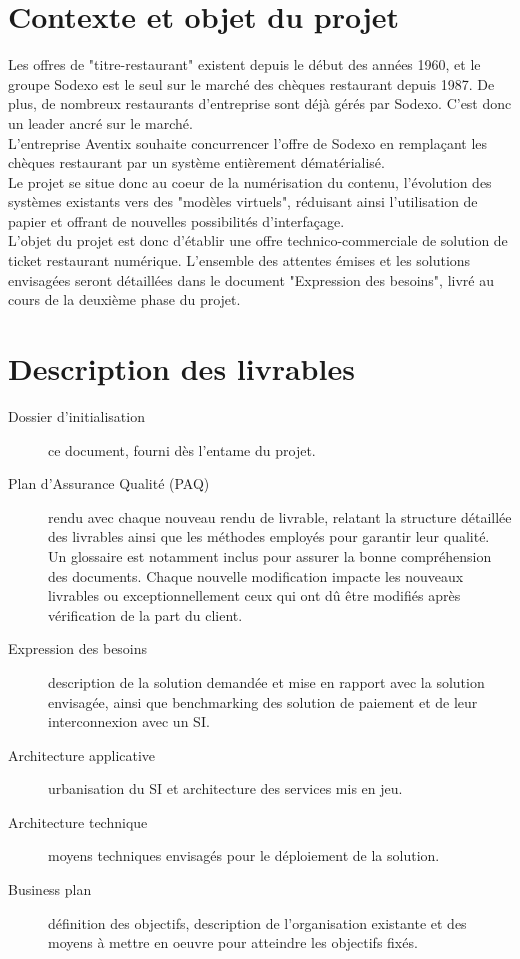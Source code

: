 




\section{Contexte et objet du projet}

Les offres de "titre-restaurant" existent depuis le début des années 1960, et
le groupe Sodexo est le seul sur le marché des chèques restaurant depuis 1987.
De plus, de nombreux restaurants d'entreprise sont déjà gérés par Sodexo. C'est
donc un leader ancré sur le marché. \\

L'entreprise Aventix souhaite concurrencer l'offre de Sodexo en remplaçant les
chèques restaurant par un système entièrement dématérialisé. \\

Le projet se situe donc au coeur de la numérisation du contenu, l'évolution des
systèmes existants vers des "modèles virtuels", réduisant ainsi l'utilisation
de papier et offrant de nouvelles possibilités d'interfaçage. \\

L'objet du projet est donc d'établir une offre technico-commerciale de solution
de ticket restaurant numérique. L'ensemble des attentes émises et les solutions
envisagées seront détaillées dans le document "Expression des besoins", livré
au cours de la deuxième phase du projet.

\section{Description des livrables}
\begin{description}
    \item[Dossier d'initialisation] ce document, fourni dès l'entame du projet.
    \item[Plan d'Assurance Qualité (PAQ)] rendu avec chaque nouveau rendu de
        livrable, relatant la structure détaillée des livrables ainsi que les
        méthodes employés pour garantir leur qualité. Un glossaire est
        notamment inclus pour assurer la bonne compréhension des documents.
        Chaque nouvelle modification impacte les nouveaux livrables ou
        exceptionnellement ceux qui ont dû être modifiés après vérification de
        la part du client.
    \item[Expression des besoins] description de la solution demandée et mise en
        rapport avec la solution envisagée, ainsi que benchmarking des solution
        de paiement et de leur interconnexion avec un SI.
    \item[Architecture applicative] urbanisation du SI et architecture des services mis en jeu.
    \item[Architecture technique] moyens techniques envisagés pour le déploiement de la solution.
    \item[Business plan] définition des objectifs, description de l'organisation
        existante et des moyens à mettre en oeuvre pour atteindre les objectifs
        fixés.
\end{description}

